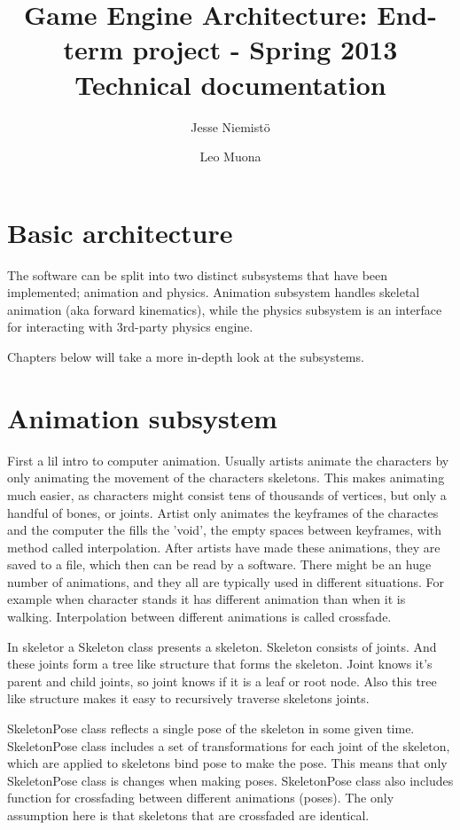 \documentclass[11pt,twoside,a4paper]{article}
\begin{document}
\author{Jesse Niemistö \and Leo Muona}
\title{Game Engine Architecture: End-term project - Spring 2013 \\
       Technical documentation}

\maketitle

\section{Basic architecture}

The software can be split into two distinct subsystems that have been implemented; animation and physics. Animation subsystem handles skeletal animation (aka forward kinematics), while the physics subsystem is an interface for interacting with 3rd-party physics engine.

Chapters below will take a more in-depth look at the subsystems.

\section{Animation subsystem}

First a lil intro to computer animation. Usually artists animate the characters by only animating the movement of the characters skeletons. This makes animating much easier, as characters might consist tens of thousands of vertices, but only a handful of bones, or joints. Artist only animates the keyframes of the charactes and the computer the fills the 'void', the empty spaces between keyframes, with method called interpolation. After artists have made these animations, they are saved to a file, which then can be read by a software. There might be an huge number of animations, and they all are typically used in different situations. For example when character stands it has different animation than when it is walking. Interpolation between different animations is called crossfade. 

In skeletor a Skeleton class presents a skeleton. Skeleton consists of joints. And these joints form a tree like structure that forms the skeleton. Joint knows it's parent and child joints, so joint knows if it is a leaf or root node. Also this tree like structure makes it easy to recursively traverse skeletons joints. 

SkeletonPose class reflects a single pose of the skeleton in some given time. SkeletonPose class includes a set of transformations for each joint of the skeleton, which are applied to skeletons bind pose to make the pose. This means that only SkeletonPose class is changes when making poses. SkeletonPose class also includes function for crossfading between different animations (poses). The only assumption here is that skeletons that are crossfaded are identical.
\end{document}
